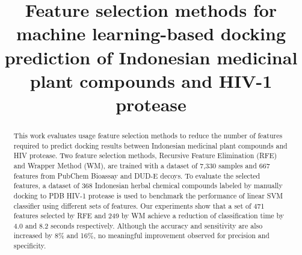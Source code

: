 \documentclass[conference]{IEEEtran}
\begin{document}
\title{Feature selection methods for machine learning-based docking prediction of Indonesian medicinal plant compounds and HIV-1 protease}



%
%	
%	

\maketitle

\begin{abstract}
	
	This work evaluates usage feature selection methods to reduce the number of features required to predict docking results between Indonesian medicinal plant compounds and HIV protease. Two feature selection methods, Recursive Feature Elimination (RFE) and Wrapper Method (WM), are trained with a dataset of 7,330 samples and 667 features from PubChem Bioassay and DUD-E decoys. To evaluate the selected features, a dataset of 368 Indonesian herbal chemical compounds labeled by manually docking to PDB HIV-1 protease is used to benchmark the performance of linear SVM classifier using different sets of features. Our experiments show that a set of 471 features selected by RFE and 249 by WM achieve a reduction of classification time by 4.0 and 8.2 seconds respectively. Although the accuracy and sensitivity are also increased by 8\% and 16\%, no meaningful improvement observed for precision and specificity.  
	
\end{abstract}
\end{document}
